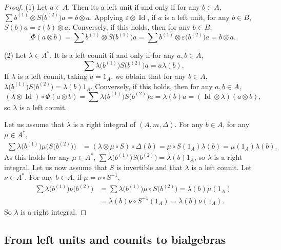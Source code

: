 \documentclass[10pt,a4paper]{amsart}
\numberwithin{equation}{section}
\begin{document}
\begin{proof}
(1) Let $a\in A$. Then its a left unit if and only if for any $b\in A$, $\sum b^{(1)}\otimes S\bigl(b^{(2)}\bigr)a=b\otimes a$. Applying $\varepsilon\otimes \operatorname{Id}$, if $a$ is a left unit, for any $b\in B$, $S(b)a=\varepsilon(b)\otimes a$.
Conversely, if this holds, then for any $b\in B$,
\[\Phi(a\otimes b)=\sum b^{(1)}\otimes S\bigl(b^{(1)}\bigr)a=\sum b^{(1)}\otimes \varepsilon\bigl(b^{(2)}\bigr) a=b\otimes a.\]

(2) Let $\lambda \in A^*$. It is a left counit if and only if for any $a,b\in A$,
\[\sum \lambda\bigl(b^{(1)}\bigr)S\bigl(b^{(2)}\bigr)a=a\lambda(b).\]
If $\lambda$ is a left counit, taking $a=1_A$, we obtain that for any $b\in A$,
$\lambda\bigl(b^{(1)}\bigr)S\bigl(b^{(2)}\bigr)=\lambda(b)1_A$. Conversely, if this holds, then for any $a,b\in A$,{\samepage
\[(\lambda\otimes \operatorname{Id})\circ \Phi(a\otimes b)=\sum \lambda\bigl(b^{(1)}\bigr)S\bigl(b^{(2)}\bigr)a=\lambda(b)a=(\operatorname{Id} \otimes \lambda)(a\otimes b),\]
so $\lambda$ is a left counit.}

Let us assume that $\lambda$ is a right integral of $(A,m,\Delta)$. For any $b\in A$, for any $\mu\in A^*$,
\begin{align*}
\sum \lambda\bigl(b^{(1)}\bigr)\mu\bigl(S\bigl(b^{(2)}\bigr)\bigr)&=(\lambda\otimes \mu\circ S)\circ \Delta(b)=\mu\circ S(1_A)\lambda(b)=\mu(1_A)\lambda(b).
\end{align*}
As this holds for any $\mu\in A^*$, $\sum \lambda\bigl(b^{(1)}\bigr)S\bigl(b^{(2)}\bigr)=\lambda(b)1_A$, so $\lambda$ is a right integral. Let us now assume that $S$ is invertible and that $\lambda$ is a left counit.
Let $\nu \in A^*$. For any $b\in A$, if $\mu=\nu \circ S^{-1}$,
\begin{align*}
\sum \lambda\bigl(b^{(1)}\bigr)\nu\bigl(b^{(2)}\bigr)&=\sum \lambda\bigl(b^{(1)}\bigr)\mu\circ S\bigl(b^{(2)}\bigr)=\lambda(b)\mu(1_A)\\
&=\lambda(b)\nu\circ S^{-1}(1_A)=\lambda(b)\nu(1_A).
\end{align*}
So $\lambda$ is a right integral.
\end{proof}


\subsection{From left units and counits to bialgebras}
\end{document}
